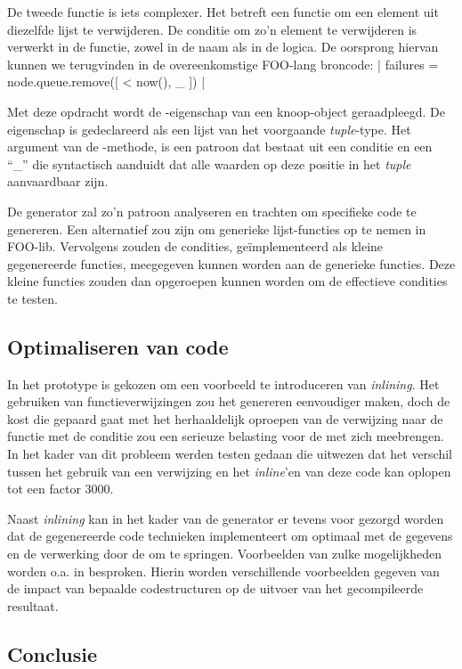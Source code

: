 De tweede functie is iets complexer. Het betreft een functie om een element uit
diezelfde lijst te verwijderen. De conditie om zo'n element te verwijderen is
verwerkt in de functie, zowel in de naam als in de logica. De oorsprong hiervan
kunnen we terugvinden in de overeenkomstige FOO-lang broncode:
| failures = node.queue.remove([ < now(), _ ]) |

Met deze opdracht wordt de -eigenschap van een knoop-object
geraadpleegd. De eigenschap is gedeclareerd als een lijst van het voorgaande
\emph{tuple}-type. Het argument van de -methode, is een patroon dat
bestaat uit een conditie  en een ``\_'' die syntactisch aanduidt
dat alle waarden op deze positie in het \emph{tuple} aanvaardbaar zijn.

De generator zal zo'n patroon analyseren en trachten om specifieke code te
genereren. Een alternatief zou zijn om generieke lijst-functies op te nemen in
FOO-lib. Vervolgens zouden de condities, ge\"implementeerd als kleine
gegenereerde functies, meegegeven kunnen worden aan de generieke functies. Deze
kleine functies zouden dan opgeroepen kunnen worden om de effectieve condities
te testen.

\subsection{Optimaliseren van code}

In het prototype is gekozen om een voorbeeld te introduceren van
\emph{inlining}. Het gebruiken van functieverwijzingen zou het genereren
eenvoudiger maken, doch de kost die gepaard gaat met het herhaaldelijk oproepen
van de verwijzing naar de functie met de conditie zou een serieuze belasting
voor de \mcu met zich meebrengen. In het kader van dit probleem werden testen
gedaan die uitwezen dat het verschil tussen het gebruik van een verwijzing en
het \emph{inline}'en van deze code kan oplopen tot een factor 3000.

Naast \emph{inlining} kan in het kader van de generator er tevens voor gezorgd
worden dat de gegenereerde code technieken implementeert om optimaal met de
gegevens en de verwerking door de \mcu om te springen. Voorbeelden van zulke
mogelijkheden worden o.a. in \citep{naik2001software,panda2001data} besproken.
Hierin worden verschillende voorbeelden gegeven van de impact van bepaalde
codestructuren op de uitvoer van het gecompileerde resultaat.

\subsection{Conclusie}

